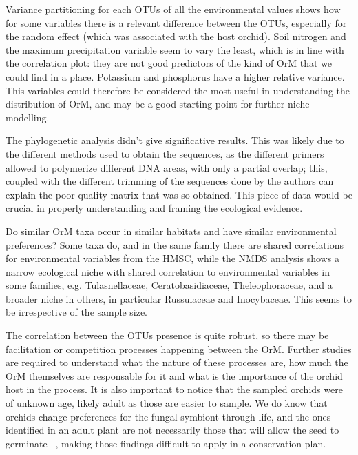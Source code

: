 Variance partitioning for each OTUs of all the environmental values shows how for some variables there is a relevant difference between the OTUs, especially for the random effect (which was associated with the host orchid). Soil nitrogen and the maximum precipitation variable seem to vary the least, which is in line with the correlation plot: they are not good predictors of the kind of OrM that we could find in a place. Potassium and phosphorus have a higher relative variance.
This variables could therefore be considered the most useful in understanding the distribution of OrM, and may be a good starting point for further niche modelling.

The phylogenetic analysis didn't give significative results. This was likely due to the different methods used to obtain the sequences, as the different primers allowed to polymerize different DNA areas, with only a partial overlap; this, coupled with the different trimming of the sequences done by the authors can explain the poor quality matrix that was so obtained.
This piece of data would be crucial in properly understanding and framing the ecological evidence.

Do similar OrM taxa occur in similar habitats and have similar environmental preferences? Some taxa do, and in the same family there are shared correlations for environmental variables from the HMSC, while the NMDS analysis shows a narrow ecological niche with shared correlation to environmental variables in some families, e.g. Tulasnellaceae, Ceratobasidiaceae, Theleophoraceae, and a broader niche in others, in particular Russulaceae and Inocybaceae. This seems to be irrespective of the sample size.

The correlation between the OTUs presence is quite robust, so there may be facilitation or competition processes happening between the OrM. Further studies are required to understand what the nature of these processes are, how much the OrM themselves are responsable for it and what is the importance of the orchid host in the process. It is also important to notice that the sampled orchids were of unknown age, likely adult as those are easier to sample. We do know that orchids change preferences for the fungal symbiont through life, and the ones identified in an adult plant are not necessarily those that will allow the seed to germinate ~\citep{meng2019}, making those findings difficult to apply in a conservation plan.

